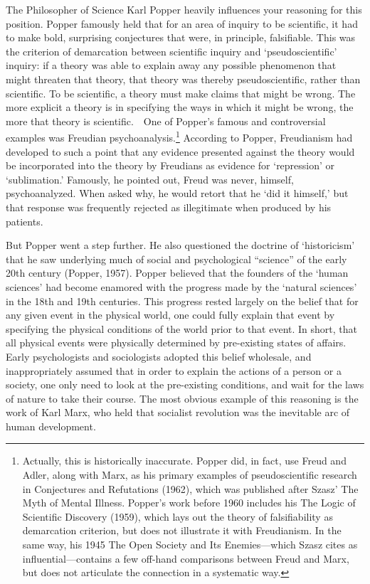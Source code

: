 \begin{refsection}
The Philosopher of Science Karl Popper heavily influences your reasoning for this position. Popper famously held that for an area of inquiry to be scientific, it had to make bold, surprising conjectures that were, in principle, falsifiable. This was the criterion of demarcation between scientific inquiry and `pseudoscientific' inquiry: if a theory was able to explain away any possible phenomenon that might threaten that theory, that theory was thereby pseudoscientific, rather than scientific. To be scientific, a theory must make claims that might be wrong. The more explicit a theory is in specifying the ways in which it might be wrong, the more that theory is scientific.
  One of Popper’s famous and controversial examples was Freudian psychoanalysis.\footnote{Actually, this is historically inaccurate. Popper did, in fact, use Freud and Adler, along with Marx, as his primary examples of pseudoscientific research in Conjectures and Refutations (1962), which was published after Szasz' The Myth of Mental Illness. Popper's work before 1960 includes his The Logic of Scientific Discovery (1959), which lays out the theory of falsifiability as demarcation criterion, but does not illustrate it with Freudianism. In the same way, his 1945 The Open Society and Its Enemies—which Szasz cites as influential—contains a few off-hand comparisons between Freud and Marx, but does not articulate the connection in a systematic way.} According to Popper, Freudianism had developed to such a point that any evidence presented against the theory would be incorporated into the theory by Freudians as evidence for ‘repression’ or ‘sublimation.’ Famously, he pointed out, Freud was never, himself, psychoanalyzed. When asked why, he would retort that he `did it himself,' but that response was frequently rejected as illegitimate when produced by his patients.

But Popper went a step further. He also questioned the doctrine of ‘historicism’ that he saw underlying much of social and psychological “science” of the early 20th century (Popper, 1957). Popper believed that the founders of the ‘human sciences’ had become enamored with the progress made by the ‘natural sciences’ in the 18th and 19th centuries. This progress rested largely on the belief that for any given event in the physical world, one could fully explain that event by specifying the physical conditions of the world prior to that event. In short, that all physical events were physically determined by pre-existing states of affairs. Early psychologists and sociologists adopted this belief wholesale, and inappropriately assumed that in order to explain the actions of a person or a society, one only need to look at the pre-existing conditions, and wait for the laws of nature to take their course. The most obvious example of this reasoning is the work of Karl Marx, who held that socialist revolution was the inevitable arc of human development. 


\end{refsection}
